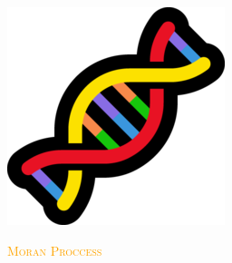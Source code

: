 \documentclass{beamer}
\begin{document}
\begin{frame}
    \centering
    \includegraphics[width=.35\textwidth]{static/evolution.png}
\end{frame}


\begin{frame}
    \begin{center}
    
    \end{center}
\end{frame}

\begin{frame}
    \begin{center}
    \vspace{-1cm}

    
    \end{center}
\end{frame}

\begin{frame}
    \begin{center}
        \Large
        \textcolor{orange}{\textsc{Moran Proccess}} \\ \vspace{3pt}
    \end{center}
\end{frame}

\begin{frame}
    \begin{center}
    
    \end{center}
\end{frame}
\end{document}
